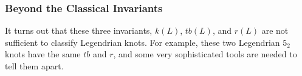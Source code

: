 \documentclass{beamer}
\begin{document}
\begin{frame}
    \frametitle{Beyond the Classical Invariants}
    It turns out that these three invariants, $k(L)$, $tb(L)$, and $r(L)$
    are not sufficient to classify Legendrian knots. For example, these
    two Legendrian $5_2$ knots have the same $tb$ and $r$, and some very
    sophisticated tools are needed to tell them apart.
\end{frame}


     
    
\end{document}
